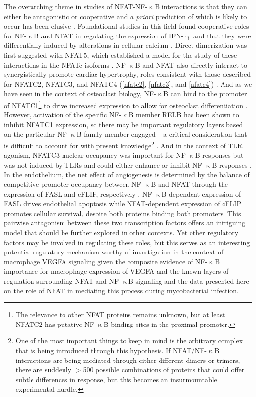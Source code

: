 The overarching theme in studies of NFAT\hyp{}NF\hyp{}$\upkappa$B interactions is that they can either be antagonistic or cooperative and \textit{a priori} prediction of which is likely to occur has been elusive \citep{Fisher2006, Khalaf2013}. Foundational studies in this field found cooperative roles for NF\hyp{}$\upkappa$B and NFAT in regulating the expression of IFN\hyp{}$\upgamma$ \citep{Sica1997} and that they were differentially induced by alterations in cellular calcium \citep{Dolmetsch1997}. Direct dimerization was first suggested with NFAT5, which established a model for the study of these interactions in the NFATc isoforms \citep{LopezRodriguez2001}. NF\hyp{}$\upkappa$B and NFAT also directly interact to synergistically promote cardiac hypertrophy, roles consistent with those described for NFATC2, NFATC3, and NFATC4 (\autoref{nfatc2}, \autoref{nfatc3}, and \autoref{nfatc4}) \citep{Liu2012}. And as we have seen in the context of osteoclast biology, NF\hyp{}$\upkappa$B can bind to the promoter of NFATC1\footnote{The relevance to other NFAT proteins remains unknown, but at least NFATC2 has putative NF\hyp{}$\upkappa$B binding sites in the proximal promoter.} to drive increased expression to allow for osteoclast differentiation \citep{Asagiri2005}. However, activation of the specific NF\hyp{}$\upkappa$B member RELB has been shown to inhibit NFATC1 expression, so there may be important regulatory layers based on the particular NF\hyp{}$\upkappa$B family member engaged -- a critical consideration that is difficult to account for with present knowledge\footnote{One of the most important things to keep in mind is the arbitrary complex that is being introduced through this hypothesis. If NFAT/NF\hyp{}$\upkappa$B interactions are being mediated through either different dimers or trimers, there are suddenly $>$500 possible combinations of proteins that could offer subtle differences in response, but this becomes an insurmountable experimental hurdle.} \citep{Zhao2015}. And in the context of TLR agonism, NFATC3 nuclear occupancy was important for NF\hyp{}$\upkappa$B responses but was not induced by TLRs and could either enhance or inhibit NF\hyp{}$\upkappa$B responses \citep{Conboy1999, Minematsu2011}. In the endothelium, the net effect of angiogenesis is determined by the balance of competitive promoter occupancy between NF\hyp{}$\upkappa$B and NFAT through the expression of FASL and cFLIP, respectively \citep{Aurora2010}. NF\hyp{}$\upkappa$B\hyp{}dependent expression of FASL drives endothelial apoptosis while NFAT\hyp{}dependent expression of cFLIP promotes cellular survival, despite both proteins binding both promoters. This pairwise antagonism between these two transcription factors offers an intriguing model that should be further explored in other contexts. Yet other regulatory factors may be involved in regulating these roles, but this serves as an interesting potential regulatory mechanism worthy of investigation in the context of macrophage VEGFA signaling given the composite evidence of NF\hyp{}$\upkappa$B importance for macrophage expression of VEGFA and the known layers of regulation surrounding NFAT and NF\hyp{}$\upkappa$B signaling and the data presented here on the role of NFAT in mediating this process during mycobacterial infection.


